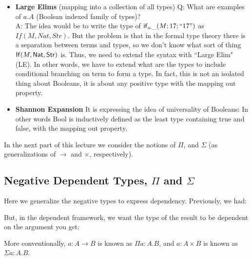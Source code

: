 \documentclass{article}
\begin{document}
\begin{itemize}
\item {\bf Large Elims} (mapping into a collection of all types)
Q: What are examples of $a.A$ (Boolean indexed family of types)?\\
A: The idea would be to write the type of $\mathsf{if}_{a.\_}(M;17;``17")$ as $If(M,Nat,Str)$. But the problem is that in the formal type theory there is a separation between terms and types, so we don't know what sort of thing $\mathsf{If}(M,\mathsf{Nat},\mathsf{Str})$ is. Thus, we need to extend the syntax with ``Large Elim" (LE). In other words, we have to extend what are the types to include conditional branching on term to form a type. In fact, this is not an isolated thing about Booleans, it is about any positive type with the mapping out property.\\
\item {\bf Shannon Expansion} It is expressing the idea of universality of Booleans: In other words Bool is inductively defined as the least type containing true and false, with the mapping out property.
\end{itemize}
In the next part of this lecture we consider the notions of $\Pi$, and $\Sigma$ (as generalizations of $\rightarrow$ and $\times$, respectively).\\
\subsection{ Negative Dependent Types, $\Pi$ and $\Sigma$}
Here we generalize the negative types to express dependency.
Previously, we had: 
But, in the dependent framework, we want the type of the result to be dependent on the argument you get: 
More conventionally, $a : A \rightarrow B$ is known as $\Pi a:A.B$, and $a: A \times B$ is known as $\Sigma a:A.B$.
\end{document}
